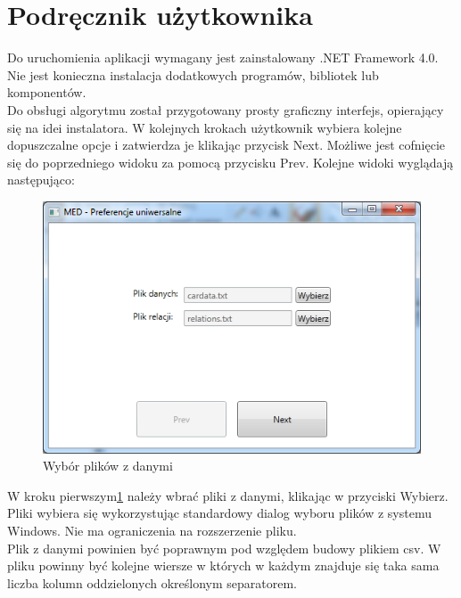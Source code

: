 \documentclass[a4paper,12pt]{article}
\begin{document}
\appendix
\section{Podręcznik użytkownika}

Do uruchomienia aplikacji wymagany jest zainstalowany .NET Framework 4.0. Nie jest konieczna instalacja dodatkowych programów, bibliotek lub komponentów.\\

Do obsługi algorytmu został przygotowany prosty graficzny interfejs, opierający
się na idei instalatora. W kolejnych krokach użytkownik wybiera kolejne dopuszczalne opcje i zatwierdza je klikając przycisk Next. Możliwe jest cofnięcie się do poprzedniego widoku za pomocą przycisku Prev. Kolejne widoki wyglądają następująco:

\begin{figure}[h!]
\begin{center}
\includegraphics[width=\textwidth]{img/1.png}
\caption{Wybór plików z danymi}
\label{krok1}
\end{center}
\end{figure}

W kroku pierwszym\ref{krok1} należy wbrać pliki z danymi, klikając w przyciski Wybierz. Pliki wybiera się wykorzystując standardowy dialog wyboru plików z systemu Windows. Nie ma ograniczenia na rozszerzenie pliku.\\

Plik z danymi powinien być poprawnym pod względem budowy plikiem csv. W pliku powinny być kolejne wiersze w których w każdym znajduje się taka sama liczba kolumn oddzielonych określonym separatorem.\\
\end{document}
